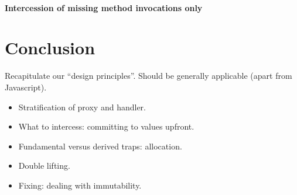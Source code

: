 \documentclass{acm_proc_article-sp}
\begin{document}
\paragraph{Intercession of missing method invocations only}




\section{Conclusion}

Recapitulate our ``design principles''. Should be generally applicable (apart from Javascript).
\begin{itemize}
  \item Stratification of proxy and handler.
  \item What to intercess: committing to values upfront.
  \item Fundamental versus derived traps: allocation.
  \item Double lifting.
  \item Fixing: dealing with immutability.
\end{itemize}



\end{document}
